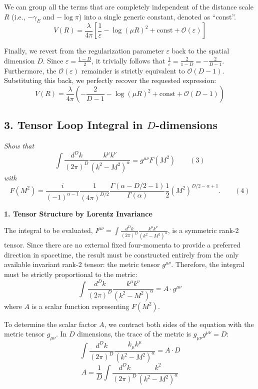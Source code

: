 We can group all the terms that are completely independent of the distance scale $R$ (i.e., $-\gamma_E$ and $-\log\pi$) into a single generic constant, denoted as ``const''.
\[
    V(R) = \frac{\lambda}{4\pi} \left[ \frac{1}{\varepsilon} - \log(\mu R)^2 + \text{const} + \mathcal{O}(\varepsilon) \right]
\]

Finally, we revert from the regularization parameter $\varepsilon$ back to the spatial dimension $D$. Since $\varepsilon = \frac{1-D}{2}$, it trivially follows that $\frac{1}{\varepsilon} = \frac{2}{1-D} = -\frac{2}{D-1}$. Furthermore, the $\mathcal{O}(\varepsilon)$ remainder is strictly equivalent to $\mathcal{O}(D-1)$. Substituting this back, we perfectly recover the requested expression:
\[
    V(R) = \frac{\lambda}{4\pi} \left( -\frac{2}{D-1} - \log(\mu R)^2 + \text{const} + \mathcal{O}(D-1) \right)
\]


\subsection*{3. Tensor Loop Integral in $D$-dimensions}

\begin{center}
    \textit{Show that}
    \[
        \int \frac{d^D k}{(2\pi)^D} \frac{k^\mu k^\nu}{(k^2 - M^2)^\alpha} = g^{\mu\nu} F(M^2) \qquad (3)
    \]
    \textit{with}
    \[
        F(M^2) = \frac{i}{(-1)^{\alpha-1}} \frac{1}{(4\pi)^{D/2}} \frac{\Gamma(\alpha - D/2 - 1)}{\Gamma(\alpha)} \frac{1}{2} (M^2)^{D/2 - \alpha + 1}. \qquad (4)
    \]
\end{center}

\textbf{1. Tensor Structure by Lorentz Invariance}

The integral to be evaluated, $I^{\mu\nu} = \int \frac{d^D k}{(2\pi)^D} \frac{k^\mu k^\nu}{(k^2 - M^2)^\alpha}$, is a symmetric rank-2 tensor. Since there are no external fixed four-momenta to provide a preferred direction in spacetime, the result must be constructed entirely from the only available invariant rank-2 tensor: the metric tensor $g^{\mu\nu}$.
Therefore, the integral must be strictly proportional to the metric:
\[
    \int \frac{d^D k}{(2\pi)^D} \frac{k^\mu k^\nu}{(k^2 - M^2)^\alpha} = A \cdot g^{\mu\nu}
\]
where $A$ is a scalar function representing $F(M^2)$.

To determine the scalar factor $A$, we contract both sides of the equation with the metric tensor $g_{\mu\nu}$. In $D$ dimensions, the trace of the metric is $g_{\mu\nu} g^{\mu\nu} = D$:
\[
    \int \frac{d^D k}{(2\pi)^D} \frac{k_\mu k^\mu}{(k^2 - M^2)^\alpha} = A \cdot D
\]
\[
    A = \frac{1}{D} \int \frac{d^D k}{(2\pi)^D} \frac{k^2}{(k^2 - M^2)^\alpha}
\]

